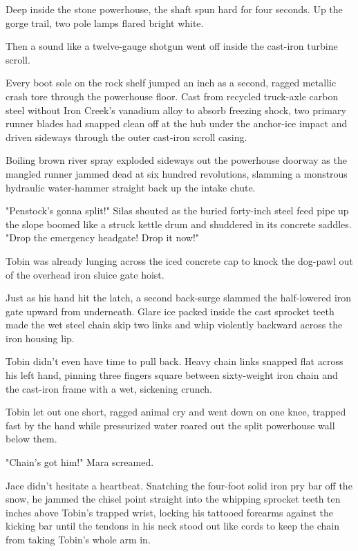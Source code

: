 Deep inside the stone powerhouse, the shaft spun hard for four seconds. Up the gorge trail, two pole lamps flared bright white.

Then a sound like a twelve-gauge shotgun went off inside the cast-iron turbine scroll.

Every boot sole on the rock shelf jumped an inch as a second, ragged metallic crash tore through the powerhouse floor. Cast from recycled truck-axle carbon steel without Iron Creek's vanadium alloy to absorb freezing shock, two primary runner blades had snapped clean off at the hub under the anchor-ice impact and driven sideways through the outer cast-iron scroll casing.

Boiling brown river spray exploded sideways out the powerhouse doorway as the mangled runner jammed dead at six hundred revolutions, slamming a monstrous hydraulic water-hammer straight back up the intake chute.

"Penstock's gonna split!" Silas shouted as the buried forty-inch steel feed pipe up the slope boomed like a struck kettle drum and shuddered in its concrete saddles. "Drop the emergency headgate! Drop it now!"

Tobin was already lunging across the iced concrete cap to knock the dog-pawl out of the overhead iron sluice gate hoist.

Just as his hand hit the latch, a second back-surge slammed the half-lowered iron gate upward from underneath. Glare ice packed inside the cast sprocket teeth made the wet steel chain skip two links and whip violently backward across the iron housing lip.

Tobin didn't even have time to pull back. Heavy chain links snapped flat across his left hand, pinning three fingers square between sixty-weight iron chain and the cast-iron frame with a wet, sickening crunch.

Tobin let out one short, ragged animal cry and went down on one knee, trapped fast by the hand while pressurized water roared out the split powerhouse wall below them.

"Chain's got him!" Mara screamed.

Jace didn't hesitate a heartbeat. Snatching the four-foot solid iron pry bar off the snow, he jammed the chisel point straight into the whipping sprocket teeth ten inches above Tobin's trapped wrist, locking his tattooed forearms against the kicking bar until the tendons in his neck stood out like cords to keep the chain from taking Tobin's whole arm in.

